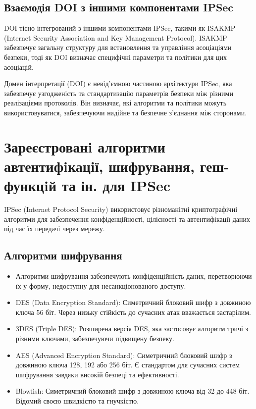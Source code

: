 \subsection{Взаємодія DOI з іншими компонентами IPSec}

DOI тісно інтегрований з іншими компонентами IPSec, такими як ISAKMP (Internet Security Association and Key Management Protocol). ISAKMP забезпечує загальну структуру для встановлення та управління асоціаціями безпеки, тоді як DOI визначає специфічні параметри та політики для цих асоціацій.

Домен інтерпретації (DOI) є невід'ємною частиною архітектури IPSec, яка забезпечує узгодженість та стандартизацію параметрів безпеки між різними реалізаціями протоколів. Він визначає, які алгоритми та політики можуть використовуватися, забезпечуючи надійне та безпечне з'єднання між сторонами.

\section{Зареєстрованi алгоритми автентифiкацiї, шифрування, геш-функцiй та ін. для IPSec}

IPSec (Internet Protocol Security) використовує різноманітні криптографічні алгоритми для забезпечення конфіденційності, цілісності та автентифікації даних під час їх передачі через мережу.

\subsection{Алгоритми шифрування}

\begin{itemize}
    \item Алгоритми шифрування забезпечують конфіденційність даних, перетворюючи їх у форму, недоступну для несанкціонованого доступу.
    \item DES (Data Encryption Standard): Симетричний блоковий шифр з довжиною ключа 56 біт. Через низьку стійкість до сучасних атак вважається застарілим.
    \item 3DES (Triple DES): Розширена версія DES, яка застосовує алгоритм тричі з різними ключами, забезпечуючи підвищену безпеку.
    \item AES (Advanced Encryption Standard): Симетричний блоковий шифр з довжиною ключа 128, 192 або 256 біт. Є стандартом для сучасних систем шифрування завдяки високій безпеці та ефективності.
    \item Blowfish: Симетричний блоковий шифр з довжиною ключа від 32 до 448 біт. Відомий своєю швидкістю та гнучкістю.
\end{itemize}

